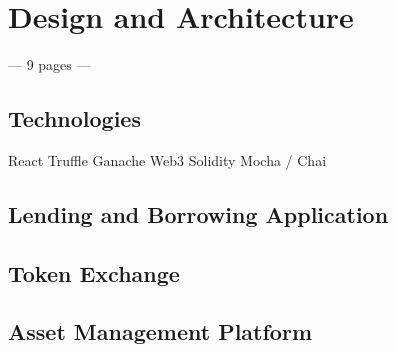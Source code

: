 \chapter{Design and Architecture}
--- 9 pages ---
\label{cha:DesignArchitecture}

\section{Technologies}


React
Truffle
Ganache
Web3
Solidity
Mocha / Chai

\section{Lending and Borrowing Application}


\section{Token Exchange}


\section{Asset Management Platform}
